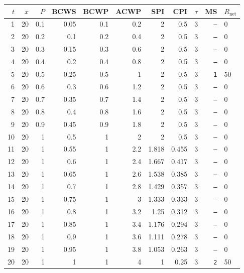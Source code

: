 \documentclass[12pt, a4paper]{article}
\begin{document}
\begin{center}
\begin{tabular}{rrrrrrrrrrl}
\toprule
$t$ & $x$ & $P$ & BCWS & BCWP & ACWP & SPI & CPI & $\tau$ & MS & $R_{\mathrm{net}}$\\
\midrule
1 & 20 & 0.1 & 0.05 & 0.1 & 0.2 & 2 & 0.5 & 3 & \texttt{---} & 0 \\
2 & 20 & 0.2 & 0.1 & 0.2 & 0.4 & 2 & 0.5 & 3 & \texttt{---} & 0 \\
3 & 20 & 0.3 & 0.15 & 0.3 & 0.6 & 2 & 0.5 & 3 & \texttt{---} & 0 \\
4 & 20 & 0.4 & 0.2 & 0.4 & 0.8 & 2 & 0.5 & 3 & \texttt{---} & 0 \\
5 & 20 & 0.5 & 0.25 & 0.5 & 1 & 2 & 0.5 & 3 & \texttt{1} & 50 \\
6 & 20 & 0.6 & 0.3 & 0.6 & 1.2 & 2 & 0.5 & 3 & \texttt{---} & 0 \\
7 & 20 & 0.7 & 0.35 & 0.7 & 1.4 & 2 & 0.5 & 3 & \texttt{---} & 0 \\
8 & 20 & 0.8 & 0.4 & 0.8 & 1.6 & 2 & 0.5 & 3 & \texttt{---} & 0 \\
9 & 20 & 0.9 & 0.45 & 0.9 & 1.8 & 2 & 0.5 & 3 & \texttt{---} & 0 \\
10 & 20 & 1 & 0.5 & 1 & 2 & 2 & 0.5 & 3 & \texttt{---} & 0 \\
11 & 20 & 1 & 0.55 & 1 & 2.2 & 1.818 & 0.455 & 3 & \texttt{---} & 0 \\
12 & 20 & 1 & 0.6 & 1 & 2.4 & 1.667 & 0.417 & 3 & \texttt{---} & 0 \\
13 & 20 & 1 & 0.65 & 1 & 2.6 & 1.538 & 0.385 & 3 & \texttt{---} & 0 \\
14 & 20 & 1 & 0.7 & 1 & 2.8 & 1.429 & 0.357 & 3 & \texttt{---} & 0 \\
15 & 20 & 1 & 0.75 & 1 & 3 & 1.333 & 0.333 & 3 & \texttt{---} & 0 \\
16 & 20 & 1 & 0.8 & 1 & 3.2 & 1.25 & 0.312 & 3 & \texttt{---} & 0 \\
17 & 20 & 1 & 0.85 & 1 & 3.4 & 1.176 & 0.294 & 3 & \texttt{---} & 0 \\
18 & 20 & 1 & 0.9 & 1 & 3.6 & 1.111 & 0.278 & 3 & \texttt{---} & 0 \\
19 & 20 & 1 & 0.95 & 1 & 3.8 & 1.053 & 0.263 & 3 & \texttt{---} & 0 \\
20 & 20 & 1 & 1 & 1 & 4 & 1 & 0.25 & 3 & \texttt{2} & 50 \\
\bottomrule
\end{tabular}
\end{center}
\end{document}

